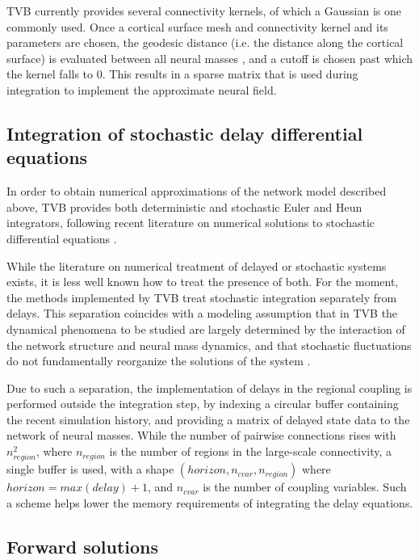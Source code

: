 	TVB currently provides several connectivity kernels, of which a Gaussian
	is one commonly used. Once a cortical surface mesh 
	and connectivity kernel and its parameters are chosen, the geodesic
	distance (i.e. the distance along the cortical surface) is evaluated
	between all neural masses \citep{Mitchell1987}, and a cutoff is chosen
	past which the kernel falls to 0. This results in a sparse matrix that 
	is used during integration to implement the approximate neural field. 

\subsection{Integration of stochastic delay differential equations}

	In order to obtain numerical approximations of the network model 
	described above, TVB provides both deterministic and stochastic
	Euler and Heun integrators,
	following recent literature on numerical solutions to stochastic
	differential equations \citep{Kloeden_1995,Mannella_2002,Mannella_1989}.

	While the literature on numerical treatment of delayed or 
	stochastic systems exists, it is less well known how to treat 
	the presence of both. For the moment, the methods implemented by TVB
	treat stochastic integration separately from delays. 
	This separation coincides with a modeling assumption that in
	TVB the dynamical phenomena to be studied are largely determined
	by the interaction of the network structure and neural mass dynamics, 
	and that stochastic fluctuations do not fundamentally reorganize the
	solutions of the system \citep{Ghosh_2008,Deco_2009,Deco_2011,Deco_Senden_2012}.

	Due to such a separation, the implementation of delays in the
	regional coupling is performed outside the integration step,
	by indexing a circular buffer containing the recent simulation 
	history, and providing a matrix of delayed state data to the 
	network of neural masses. While the number of pairwise
	connections rises with $n_{region}^2$, where $n_{region}$ is
	the number of regions in the large-scale connectivity, 
	a single buffer is used, with a shape
	$(horizon, n_{cvar}, n_{region})$ where $horizon = max(delay) + 1$,
	and
	$n_{cvar}$ is the number of coupling variables. Such a scheme helps 
	lower the memory requirements of integrating the delay equations.

\subsection{Forward solutions}

